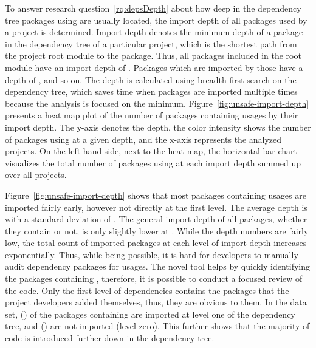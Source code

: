 To answer research question~\ref{rq:depsDepth} about how deep in the dependency tree packages using \unsafe{} are
usually located, the import depth of all packages used by a project is determined.
Import depth denotes the minimum depth of a package in the dependency tree of a particular project, which is the
shortest path from the project root module to the package.
Thus, all packages included in the root module have an import depth of .
Packages which are imported by those have a depth of , and so on.
The depth is calculated using breadth-first search on the dependency tree, which saves time when packages are imported
multiple times because the analysis is focused on the minimum.
Figure~\ref{fig:unsafe-import-depth} presents a heat map plot of the number of packages containing \unsafe{} usages by
their import depth.
The y-axis denotes the depth, the color intensity shows the number of packages using \unsafe{} at a given depth, and the
x-axis represents the \projsAnalyzed{} analyzed projects.
On the left hand side, next to the heat map, the horizontal bar chart visualizes the total number of packages using
\unsafe{} at each import depth summed up over all projects.



Figure~\ref{fig:unsafe-import-depth} shows that most packages containing \unsafe{} usages are imported fairly early,
however not directly at the first level.
The average depth is \averageUnsafeImportDepth{} with a standard deviation of \stdUnsafeImportDepth{}.
The general import depth of all packages, whether they contain \unsafe{} or not, is only slightly lower at
\averageGeneralImportDepth{}.
While the depth numbers are fairly low, the total count of imported packages at each level of import depth increases
exponentially.
Thus, while being possible, it is hard for developers to manually audit dependency packages for \unsafe{} usages.
The novel \toolGeiger{} tool helps by quickly identifying the packages containing \unsafe{}, therefore, it is possible
to conduct a focused review of the \unsafe{} code.
Only the first level of dependencies contains the packages that the project developers added themselves, thus, they are
obvious to them.
In the data set, \levelOneImportedUnsafePackagesCount{} (\levelOneImportedUnsafePackagesShare{}) of the
\unsafePackages{} packages containing \unsafe{} are imported at level one of the dependency tree, and
\levelZeroImportedUnsafePackagesCount{} (\levelZeroImportedUnsafePackagesShare{}) are not imported (level zero).
This further shows that the majority of \unsafe{} code is introduced further down in the dependency tree.

